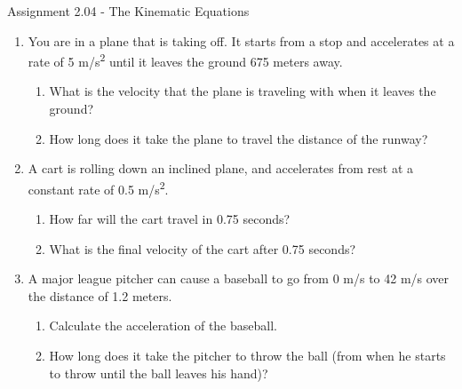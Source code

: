 \documentclass[letterpaper, 12pt]{article}
\begin{document}


\begin{center} Assignment 2.04 - The Kinematic Equations
\end{center}





\begin{enumerate}
\item You are in a plane that is taking off.  It starts from a stop and accelerates at a rate of 5 m/s\textsuperscript{2} until it leaves the ground 675 meters away.  
	\begin{enumerate} 
		\item What is the velocity that the plane is traveling with when it leaves the ground? 
		\vspace{.75in}
		\item How long does it take the plane to travel the distance of the runway?
		\vspace{.75in}
	\end{enumerate}
	\item A cart is rolling down an inclined plane, and accelerates from rest at a constant rate of 0.5 m/s\textsuperscript{2}. 
	\begin{enumerate}
		\item How far will the cart travel in 0.75 seconds?
		\vspace{.75in}
		\item What is the final velocity of the cart after 0.75 seconds?
		\vspace{.75in}		
	\end{enumerate}
	\item A major league pitcher can cause a baseball to go from 0 m/s to 42 m/s over the distance of 1.2 meters.  
	\begin{enumerate}
		\item Calculate the acceleration of the baseball.
		\vspace{.75in}
		\item How long does it take the pitcher to throw the ball (from when he starts to throw until the ball leaves his hand)?
		\vspace{.75in}
	\end{enumerate}





\end{enumerate}
\end{document}
